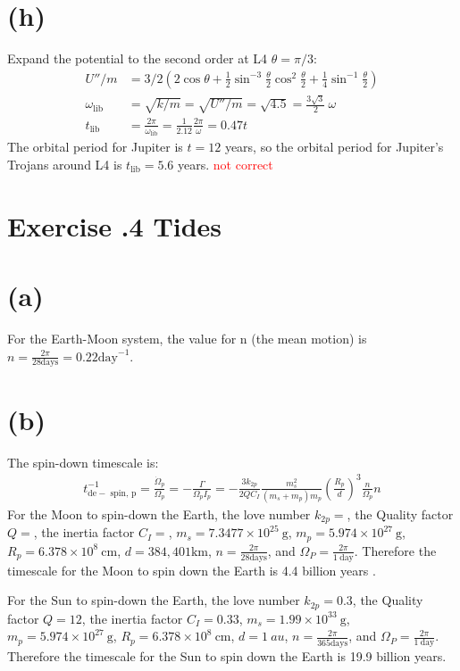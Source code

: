 \documentclass[a4paper,12pt]{article}
\newcommand{\cm}{\mathrm{cm}}
\newcommand{\g}{\mathrm{g}}
\begin{document}
\section*{(h)}
Expand the potential to the second order at L4 $\theta=\pi/3$:
\begin{align*}
    U''/m &= 3/2(2\cos \theta + \frac{1}{2} \sin^{-3} \frac{\theta}{2} \cos ^2 \frac{\theta}{2} + \frac{1}{4} \sin ^{-1} \frac{\theta}{2}) \\
    \omega_{\text{lib}} &= \sqrt{k/m} = \sqrt{U''/m} = \sqrt{4.5} = \frac{3\sqrt{3}}{2} \ \omega \\
    t_{\text{lib}} &= \frac{2\pi}{\omega_{\text{lib}}} = \frac{1}{2.12}\frac{2\pi}{\omega} = 0.47 t
\end{align*}
The orbital period for Jupiter is $t=12$ years, so the orbital period for Jupiter's Trojans around L4 is $t_{\text{lib}}=5.6$ years.
\textcolor{red}{not correct}

\section*{\textbf{Exercise \uppercase\expandafter{}.4 Tides}}
\section*{(a)}
For the Earth-Moon system, the value for n (the mean motion) is $n = \frac{2\pi}{28 \text{days}} = 0.22 \text{day}^{-1}$.

\section*{(b)}
The spin-down timescale is:
\begin{align*}
    t_{\mathrm{de}-\text { spin, } \mathrm{p}}^{-1}=\frac{\dot{\Omega}_p}{\Omega_p}=-\frac{\Gamma}{\Omega_p I_p}=-\frac{3 k_{2 p}}{2 Q C_I} \frac{m_s^2}{\left(m_s+m_p\right) m_p}\left(\frac{R_p}{d}\right)^3 \frac{n}{\Omega_p} n
\end{align*}
For the Moon to spin-down the Earth, the love number $k_{2p} = $, the Quality factor $Q = $, 
the inertia factor $C_I = $, $m_s = 7.3477\times 10^{25} \ \g$, $m_p =5.974\times 10^{27} \ \g $, $R_p = 6.378\times 10^8 \ \cm$, $d = 384,401 \text{km}$, $n = \frac{2\pi}{28 \text{days}}$, and $\Omega_P = \frac{2\pi}{1 \ \text{day}}$. 
Therefore the timescale for the Moon to spin down the Earth is 4.4 billion years .

For the Sun to spin-down the Earth, the love number $k_{2p} = 0.3$, the Quality factor $Q = 12$, 
the inertia factor $C_I = 0.33$, $m_s = 1.99\times 10^{33}\ \g$, $m_p =5.974\times 10^{27} \ \g $, $R_p = 6.378\times 10^8 \ \cm$, $d = 1 \ au$, $n = \frac{2\pi}{365 \text{days}}$, and $\Omega_P = \frac{2\pi}{1 \ \text{day}}$.
Therefore the timescale for the Sun to spin down the Earth is 19.9 billion years.
\end{document}
